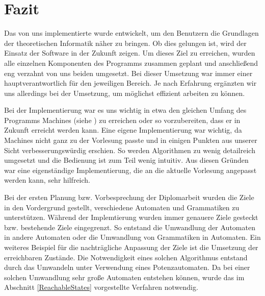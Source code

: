 



\chapter{Fazit}\label{Conclusion}

Das von uns implementierte \gtitool wurde entwickelt, um den Benutzern die
Grundlagen der theoretischen Informatik näher zu bringen. Ob dies gelungen ist,
wird der Einsatz der Software in der Zukunft zeigen. Um dieses Ziel zu erreichen,
wurden alle einzelnen Komponenten des Programms zusammen geplant und anschließend
eng verzahnt von uns beiden umgesetzt. Bei dieser Umsetzung war immer einer
hauptverantwortlich für den jeweiligen Bereich. Je nach Erfahrung ergänzten wir
uns allerdings bei der Umsetzung, um möglichst effizient arbeiten zu
können.\vspace{10pt}

Bei der Implementierung war es uns wichtig in etwa den gleichen Umfang des
Programms Machines (siehe \cite{machines}) zu erreichen oder so vorzubereiten,
dass er in Zukunft erreicht werden kann. Eine eigene Implementierung war
wichtig, da Machines nicht ganz zu der Vorlesung passte und in einigen Punkten
aus unserer Sicht verbesserungswürdig erschien. So werden Algorithmen zu wenig
detailreich umgesetzt und die Bedienung ist zum Teil wenig intuitiv. Aus diesen
Gründen war eine eigenständige Implementierung, die an die aktuelle Vorlesung
angepasst werden kann, sehr hilfreich.\vspace{10pt}

Bei der ersten Planung bzw. Vorbesprechung der Diplomarbeit wurden die Ziele in
den Vordergrund gestellt, verschiedene Automaten und Grammatiken zu
unterstützen. Während der Implemtierung wurden immer genauere Ziele gesteckt
bzw. bestehende Ziele eingegrenzt. So entstand die Umwandlung der Automaten in
andere Automaten oder die Umwandlung von Grammatiken in Automaten. Ein weiteres
Beispiel für die nachträgliche Anpassung der Ziele ist die Umsetzung der
erreichbaren Zustände. Die Notwendigkeit eines solchen Algorithmus entstand
durch das Umwandeln unter Verwendung eines Potenzautomaten. Da bei einer
solchen Umwandlung sehr große Automaten entstehen können, wurde das im
Abschnitt \ref{ReachableStates} vorgestellte Verfahren notwendig.\vspace{10pt}

